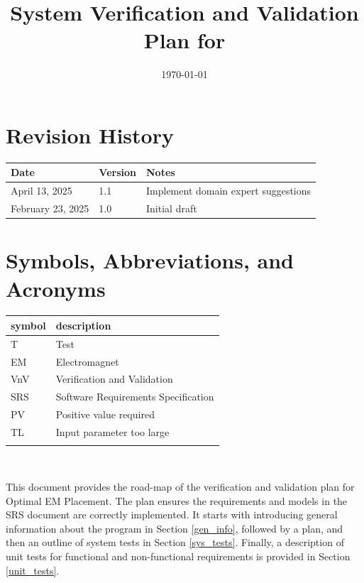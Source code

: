 \documentclass[12pt, titlepage]{article}
\begin{document}
\title{System Verification and Validation Plan for \progname{}} 
\author{\authname}
\date{\today}
	
\maketitle


\section*{Revision History}

\begin{tabularx}{\textwidth}{p{3.5cm}p{2cm}X}
\toprule {\bf Date} & {\bf Version} & {\bf Notes}\\
\midrule
April 13, 2025 & 1.1 & Implement domain expert suggestions\\
\midrule
February 23, 2025 & 1.0 & Initial draft\\
\bottomrule
\end{tabularx}


\newpage

\tableofcontents
\newpage

\section{Symbols, Abbreviations, and Acronyms}

\renewcommand{\arraystretch}{1.2}
\begin{tabular}{l l} 
  \toprule		
  \textbf{symbol} & \textbf{description}\\
  \midrule 
  T & Test\\
  EM & Electromagnet\\
  VnV & Verification and Validation \\
  SRS & Software Requirements Specification \\
  PV & Positive value required \\
  TL & Input parameter too large \\
  \bottomrule
  \label{abbrevs}
\end{tabular}\\

\newpage


This document provides the road-map of the verification and validation plan for Optimal EM Placement. The plan ensures the requirements and models in the SRS document are correctly implemented. It starts with introducing general information about the program in Section \ref{gen_info}, followed by a plan, and then an outline of system tests in Section \ref{sys_tests}. Finally, a description of unit tests for functional and non-functional requirements is provided in Section \ref{unit_tests}.
\end{document}
